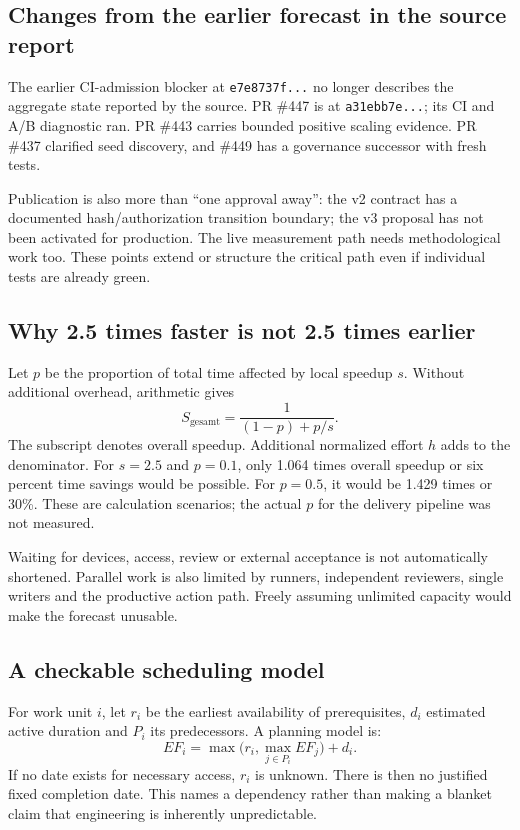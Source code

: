 \begin{cols}
\subsection*{Changes from the earlier forecast in the source report}
The earlier CI-admission blocker at \texttt{e7e8737f...} no longer describes the aggregate state reported by the source. PR \#447 is at \texttt{a31ebb7e...}; its CI and A/B diagnostic ran. PR \#443 carries bounded positive scaling evidence. PR \#437 clarified seed discovery, and \#449 has a governance successor with fresh tests. 

Publication is also more than ``one approval away'': the v2 contract has a documented hash/authorization transition boundary; the v3 proposal has not been activated for production. The live measurement path needs methodological work too. These points extend or structure the critical path even if individual tests are already green. 

\subsection*{Why 2.5 times faster is not 2.5 times earlier}
Let $p$ be the proportion of total time affected by local speedup $s$. Without additional overhead, arithmetic gives
\[
 S_{\mathrm{gesamt}}=\frac{1}{(1-p)+p/s}.
\]
The subscript denotes overall speedup. Additional normalized effort $h$ adds to the denominator. For $s=2.5$ and $p=0.1$, only 1.064 times overall speedup or six percent time savings would be possible. For $p=0.5$, it would be 1.429 times or 30\%. These are calculation scenarios; the actual $p$ for the delivery pipeline was not measured. 

Waiting for devices, access, review or external acceptance is not automatically shortened. Parallel work is also limited by runners, independent reviewers, single writers and the productive action path. Freely assuming unlimited capacity would make the forecast unusable.

\subsection*{A checkable scheduling model}
For work unit $i$, let $r_i$ be the earliest availability of prerequisites, $d_i$ estimated active duration and $P_i$ its predecessors. A planning model is:
\[
 EF_i=\max\!\bigl(r_i,\max_{j\in P_i}EF_j\bigr)+d_i.
\]
If no date exists for necessary access, $r_i$ is unknown. There is then no justified fixed completion date. This names a dependency rather than making a blanket claim that engineering is inherently unpredictable.


\end{cols}
